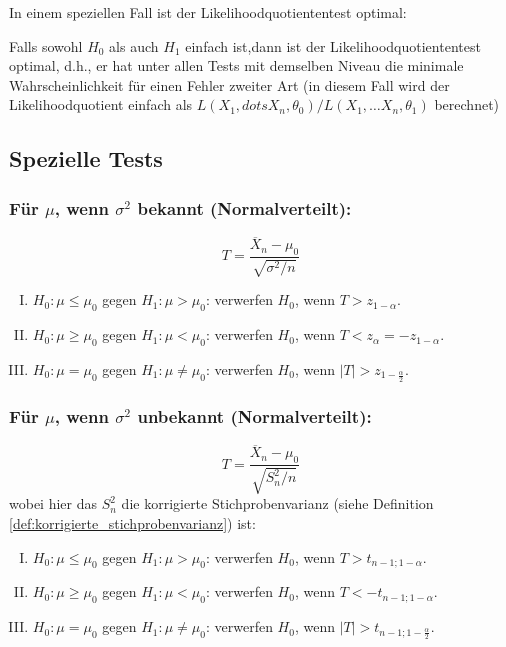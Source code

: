 
In einem speziellen Fall ist der Likelihoodquotiententest optimal:

\begin{satz}  Falls sowohl $H_0$ als auch $H_1$ einfach
ist,dann ist der Likelihoodquotiententest optimal, d.h., er hat unter
allen Tests mit demselben Niveau die minimale Wahrscheinlichkeit für
einen Fehler zweiter Art (in diesem Fall wird der Likelihoodquotient
einfach als $L(X_1,dots X_n,\theta_0)/L(X_1,\dots X_n,\theta_1)$
berechnet)
\end{satz}

\subsection{Spezielle Tests}\label{sec:spezielle_tests}
\subsubsection{Für $\mu$, wenn $\sigma^2$ bekannt (Normalverteilt):}
\[T=\frac{\overline X_n-\mu_0}{\sqrt{\sigma^2/n}}\]
\begin{enumerate}[(I)]
    \item $H_0:\mu \le \mu_0$ gegen $H_1:\mu>\mu_0$:
    verwerfen $H_0$, wenn $T>z_{1-\alpha}$.
    \item $H_0:\mu \ge \mu_0$ gegen $H_1:\mu<\mu_0$:
    verwerfen $H_0$, wenn $T<z_\alpha=-z_{1-\alpha}$.
    \item $H_0:\mu =\mu_0$ gegen $H_1:\mu\neq\mu_0$:
    verwerfen $H_0$, wenn $|T|>z_{1-\frac{\alpha}{2}}$.
\end{enumerate}

\subsubsection{Für $\mu$, wenn $\sigma^2$ unbekannt (Normalverteilt):}
\[T=\frac{\overline X_n-\mu_0}{\sqrt{S_n^2/n}}\]
wobei hier das $S_n^2$ die korrigierte Stichprobenvarianz (siehe Definition \ref{def:korrigierte_stichprobenvarianz}) ist:
\begin{enumerate}[(I)]
    \item $H_0:\mu \le \mu_0$ gegen $H_1:\mu>\mu_0$:
    verwerfen $H_0$, wenn $T>t_{n-1;1-\alpha}$.
    \item $H_0:\mu \ge \mu_0$ gegen $H_1:\mu<\mu_0$:
    verwerfen $H_0$, wenn $T<-t_{n-1;1-\alpha}$.
    \item $H_0:\mu =\mu_0$ gegen $H_1:\mu\neq\mu_0$:
    verwerfen $H_0$, wenn $|T|>t_{n-1;1-\frac{\alpha}{2}}$.
\end{enumerate}


